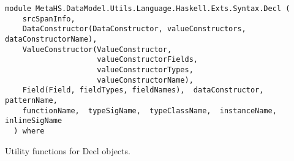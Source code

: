 \label{module:MetaHS.DataModel.Utils.Language.Haskell.Exts.Syntax.Decl}
\haddockbeginheader
{\haddockverb\begin{verbatim}
module MetaHS.DataModel.Utils.Language.Haskell.Exts.Syntax.Decl (
    srcSpanInfo, 
    DataConstructor(DataConstructor, valueConstructors, dataConstructorName), 
    ValueConstructor(ValueConstructor,
                     valueConstructorFields,
                     valueConstructorTypes,
                     valueConstructorName), 
    Field(Field, fieldTypes, fieldNames),  dataConstructor,  patternName, 
    functionName,  typeSigName,  typeClassName,  instanceName,  inlineSigName
  ) where\end{verbatim}}
\haddockendheader

Utility functions for Decl objects.\par

